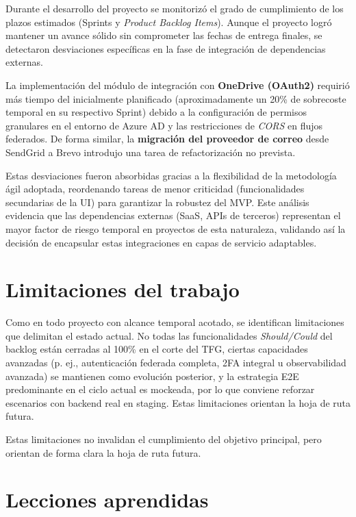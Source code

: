 Durante el desarrollo del proyecto se monitoriz\'o el grado de cumplimiento de los plazos estimados (Sprints y \textit{Product Backlog Items}). Aunque el proyecto logr\'o mantener un avance s\'olido sin comprometer las fechas de entrega finales, se detectaron desviaciones espec\'ificas en la fase de integraci\'on de dependencias externas.

La implementaci\'on del m\'odulo de integraci\'on con \textbf{OneDrive (OAuth2)} requiri\'o m\'as tiempo del inicialmente planificado (aproximadamente un 20\% de sobrecoste temporal en su respectivo Sprint) debido a la configuraci\'on de permisos granulares en el entorno de Azure AD y las restricciones de \textit{CORS} en flujos federados. De forma similar, la \textbf{migraci\'on del proveedor de correo} desde SendGrid a Brevo introdujo una tarea de refactorizaci\'on no prevista.

Estas desviaciones fueron absorbidas gracias a la flexibilidad de la metodolog\'ia \'agil adoptada, reordenando tareas de menor criticidad (funcionalidades secundarias de la UI) para garantizar la robustez del MVP. Este an\'alisis evidencia que las dependencias externas (SaaS, APIs de terceros) representan el mayor factor de riesgo temporal en proyectos de esta naturaleza, validando as\'i la decisi\'on de encapsular estas integraciones en capas de servicio adaptables.

\FloatBarrier
\section{Limitaciones del trabajo}

Como en todo proyecto con alcance temporal acotado,
se identifican limitaciones que delimitan el estado actual. No todas las funcionalidades \emph{Should/Could} del backlog est\'an cerradas al 100\% en el corte del TFG, ciertas capacidades avanzadas (p. ej., autenticaci\'on federada completa, 2FA integral u observabilidad avanzada) se mantienen como evoluci\'on posterior, y la estrategia E2E predominante en el ciclo actual es mockeada, por lo que conviene reforzar escenarios con backend real en staging. Estas limitaciones orientan la hoja de ruta futura.

Estas limitaciones no invalidan el cumplimiento del objetivo principal,
pero orientan de forma clara la hoja de ruta futura.

\FloatBarrier
\section{Lecciones aprendidas}

